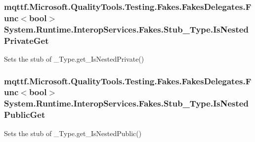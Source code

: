 \hypertarget{class_system_1_1_runtime_1_1_interop_services_1_1_fakes_1_1_stub___type_a93959d57a48384624e779406d24dc708}{
\subsubsection[{Is\-Nested\-Private\-Get}]{\setlength{\rightskip}{0pt plus 5cm}mqttf.\-Microsoft.\-Quality\-Tools.\-Testing.\-Fakes.\-Fakes\-Delegates.\-Func$<$bool$>$ System.\-Runtime.\-Interop\-Services.\-Fakes.\-Stub\-\_\-\-Type.\-Is\-Nested\-Private\-Get}}\label{class_system_1_1_runtime_1_1_interop_services_1_1_fakes_1_1_stub___type_a93959d57a48384624e779406d24dc708}


Sets the stub of \-\_\-\-Type.\-get\-\_\-\-Is\-Nested\-Private()

\hypertarget{class_system_1_1_runtime_1_1_interop_services_1_1_fakes_1_1_stub___type_abd74c19457e0bdaf876747faf328aade}{
\subsubsection[{Is\-Nested\-Public\-Get}]{\setlength{\rightskip}{0pt plus 5cm}mqttf.\-Microsoft.\-Quality\-Tools.\-Testing.\-Fakes.\-Fakes\-Delegates.\-Func$<$bool$>$ System.\-Runtime.\-Interop\-Services.\-Fakes.\-Stub\-\_\-\-Type.\-Is\-Nested\-Public\-Get}}\label{class_system_1_1_runtime_1_1_interop_services_1_1_fakes_1_1_stub___type_abd74c19457e0bdaf876747faf328aade}


Sets the stub of \-\_\-\-Type.\-get\-\_\-\-Is\-Nested\-Public()

